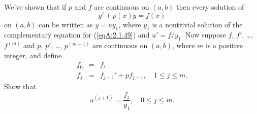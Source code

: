 \documentclass{ximera}
\begin{document}
\begin{problem}\label{exer:2.1.49}
We've shown that if $p$ and $f$ are continuous on $(a,b)$
then every solution of
\begin{equation}\label{eqA:2.1.49}
y'+p(x)y=f(x)
\end{equation}
on $(a,b)$ can be written as $y=uy_1$, where
$y_1$ is a nontrivial solution of the complementary equation for (\ref{eqA:2.1.49})
and $u'=f/y_1$. Now suppose   $f$, $f'$, \dots, $f^{(m)}$ and
$p$, $p'$, \dots, $p^{(m-1)}$ are continuous on $(a,b)$, where $m$
is a positive integer, and define
\begin{eqnarray*}
f_0&=&f,\\ f_j&=&f_{j-1}'+pf_{j-1},\quad 1\leq j\leq m.
\end{eqnarray*}
Show that
$$
u^{(j+1)}=\frac{f_j}{y_1},\quad 0\leq j\leq m.
$$
\end{problem}

\end{document}
